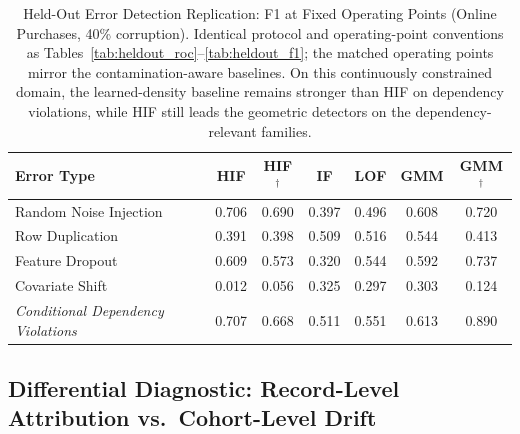 \documentclass[pdflatex,sn-mathphys-num]{sn-jnl}
\theoremstyle{thmstyleone}%
\theoremstyle{thmstyletwo}%
\theoremstyle{thmstylethree}%
\begin{document}
\begin{table}[htbp]
\centering
\caption{Held-Out Error Detection Replication: F1 at Fixed Operating Points (Online Purchases, 40\% corruption). Identical protocol and operating-point conventions as Tables~\ref{tab:heldout_roc}--\ref{tab:heldout_f1}; the matched operating points mirror the contamination-aware baselines. On this continuously constrained domain, the learned-density baseline remains stronger than HIF on dependency violations, while HIF still leads the geometric detectors on the dependency-relevant families.}
\label{tab:heldout_purchases_f1}
\footnotesize
\setlength{\tabcolsep}{2pt}
\begin{tabular}{@{}lcccccc@{}}
\toprule
\textbf{Error Type} & \textbf{HIF} & \textbf{HIF$^{\dagger}$} & \textbf{IF} & \textbf{LOF} & \textbf{GMM} & \textbf{GMM$^{\dagger}$} \\
\midrule
Random Noise Injection & 0.706 & 0.690 & 0.397 & 0.496 & 0.608 & 0.720 \\
Row Duplication & 0.391 & 0.398 & 0.509 & 0.516 & 0.544 & 0.413 \\
Feature Dropout & 0.609 & 0.573 & 0.320 & 0.544 & 0.592 & 0.737 \\
Covariate Shift & 0.012 & 0.056 & 0.325 & 0.297 & 0.303 & 0.124 \\
\midrule
\textit{Conditional Dependency Violations} & 0.707 & 0.668 & 0.511 & 0.551 & 0.613 & 0.890 \\
\bottomrule
\end{tabular}
\end{table}

\subsection{Differential Diagnostic: Record-Level Attribution vs.\ Cohort-Level Drift}\label{sec:differential}
\end{document}
